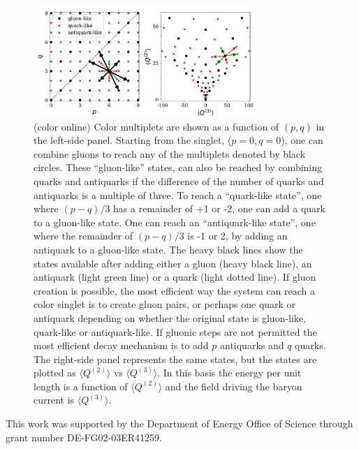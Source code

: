 \documentclass[aps, prc, 12pt, nofootinbib, showpacs, superscriptaddress, tightenlines, groupedaddress]{revtex4-2}
\begin{document}
\begin{figure}
\centerline{\includegraphics[width=0.75\textwidth]{figs/pq3.pdf}}
\caption{\label{fig:pq3}(color online)
Color multiplets are shown as a function of $(p,q)$ in the left-side panel. Starting from the singlet, ($p=0,q=0$), one can combine gluons to reach any of the multiplets denoted by black circles. These ``gluon-like'' states,  can also be reached by combining quarks and antiquarks if the difference of the number of quarks and antiquarks is a multiple of three. To reach a ``quark-like state'', one where $(p-q)/3$ has a remainder of +1 or -2, one can add a quark to a gluon-like state. One can reach an ``antiquark-like state'', one where the remainder of $(p-q)/3$ is -1 or 2, by adding an antiquark to a gluon-like state. The heavy black lines show the states available after adding either a gluon (heavy black line), an antiquark (light green line) or a quark (light dotted line). If gluon creation is possible, the most efficient way the system can reach a color singlet is to create gluon pairs, or perhaps one quark or antiquark depending on whether the original state is gluon-like, quark-like or antiquark-like. If gluonic steps are not permitted the most efficient decay mechanism is to add $p$ antiquarks and $q$ quarks. The right-side panel represents the same states, but the states are plotted as $\langle Q^{(2)}\rangle$ vs $\langle Q^{(3)}\rangle$. In this basis the energy per unit length is a function of $\langle Q^{(2)}\rangle$ and the field driving the baryon current is $\langle Q^{(3)}\rangle$.}
\end{figure}




\begin{acknowledgments}
This work was supported by the Department of Energy Office of Science through grant number DE-FG02-03ER41259.
\end{acknowledgments}


\end{document}
